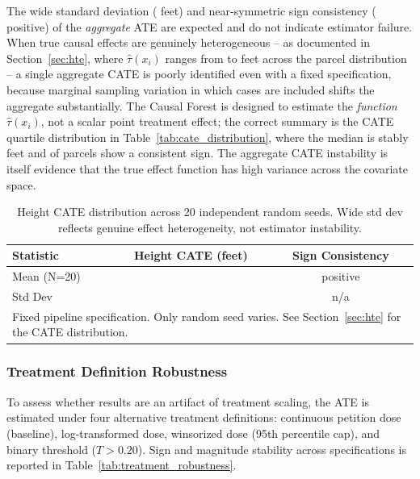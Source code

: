 \documentclass[11pt, letterpaper, oneside]{article}
\begin{document}
The wide standard deviation (\metricRobustSeedStd{} feet) and near-symmetric sign consistency (\metricRobustSeedPosPct{} positive) of the \emph{aggregate} ATE are expected and do not indicate estimator failure. When true causal effects are genuinely heterogeneous -- as documented in Section~\ref{sec:hte}, where $\hat{\tau}(x_i)$ ranges from \metricCATEHeightMin{} to \metricCATEHeightMax{} feet across the parcel distribution -- a single aggregate CATE is poorly identified even with a fixed specification, because marginal sampling variation in which cases are included shifts the aggregate substantially. The Causal Forest is designed to estimate the \emph{function} $\hat{\tau}(x_i)$, not a scalar point treatment effect; the correct summary is the CATE quartile distribution in Table~\ref{tab:cate_distribution}, where the median is stably \metricCATEHeightMedian{} feet and \metricCATEHeightPctPositive{} of parcels show a consistent sign. The aggregate CATE instability is itself evidence that the true effect function has high variance across the covariate space.

\begin{table}[!htbp]
\centering
\caption[Multi-Seed ATE Stability (N=20)]{Height CATE distribution across 20 independent random seeds. Wide std dev reflects genuine effect heterogeneity, not estimator instability.}
\label{tab:seed_stability}
\begin{tabular}{lcc}
\toprule
\textbf{Statistic} & \textbf{Height CATE (feet)} & \textbf{Sign Consistency} \\
\midrule
Mean (N=20) & \metricRobustSeedMean{} & \metricRobustSeedPosPct{} positive \\
Std Dev      & \metricRobustSeedStd{} & n/a \\
\bottomrule
\multicolumn{3}{l}{\footnotesize Fixed pipeline specification. Only random seed varies. See Section~\ref{sec:hte} for the CATE distribution.}\\
\end{tabular}
\end{table}

\subsubsection{Treatment Definition Robustness}

To assess whether results are an artifact of treatment scaling, the ATE is estimated under four alternative treatment definitions: continuous petition dose (baseline), log-transformed dose, winsorized dose (95th percentile cap), and binary threshold ($T > 0.20$). Sign and magnitude stability across specifications is reported in Table~\ref{tab:treatment_robustness}.
\end{document}
